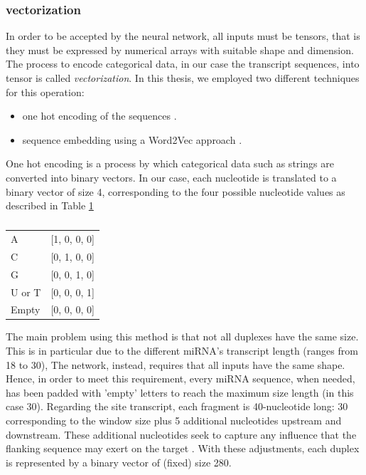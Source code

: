 \subsubsection{vectorization}
In order to be accepted by the neural network, all inputs must be tensors, that is they must be expressed by numerical arrays with suitable shape and dimension. The process to encode categorical data, in our case the transcript sequences, into tensor is called \emph{vectorization}. In this thesis, we employed two different techniques for this operation: 

\begin{itemize} 
	\item one hot encoding of the sequences \cite{onehotencode}. 
	\item sequence embedding using a Word2Vec approach \cite{word2vec}. 
\end{itemize}

One hot encoding is a process by which categorical data such as strings are converted into binary vectors. In our case, each nucleotide is translated to a binary vector of size 4, corresponding to the four possible nucleotide values as described in Table \ref{tab:ohe} 

\begin{table}[!b]
	\caption{}
	\label{tab:ohe}
	\centering
	\begin{tabular}{l l}
		\toprule
		\tabhead{Nucleotide} & \tabhead{Encoding} \\
		\midrule
		A & [1, 0, 0, 0]\\
		C & [0, 1, 0, 0]\\
		G & [0, 0, 1, 0]\\
		U or T & [0, 0, 0, 1]\\
		Empty & [0, 0, 0, 0]\\
		\bottomrule
	\end{tabular}
\end{table}

The main problem using this method is that not all duplexes have the same size. This is in particular due to the different miRNA's transcript length (ranges from 18 to 30), The network, instead, requires that all inputs have the same shape. Hence, in order to meet this requirement, every miRNA sequence, when needed, has been padded with 'empty' letters to reach the maximum size length (in this case 30). Regarding the site transcript, each fragment is 40-nucleotide long: 30 corresponding to the window size plus 5 additional nucleotides upstream and downstream. These additional nucleotides seek to capture any influence that the flanking sequence may exert on the target \cite{conserved_pairing}. With these adjustments, each duplex is represented by a binary vector of (fixed) size 280.

